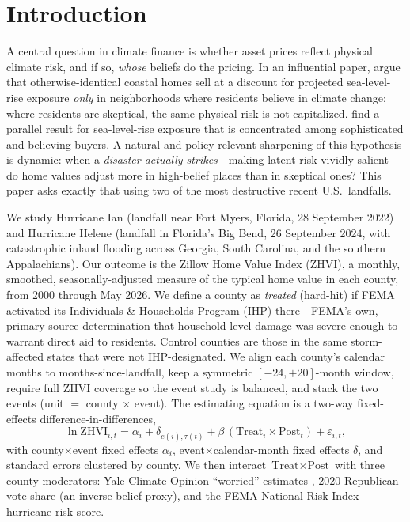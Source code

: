 \documentclass[12pt]{article}
\begin{document}
\newpage
\section{Introduction}\label{sec:intro}
A central question in climate finance is whether asset prices reflect physical climate risk,
and if so, \emph{whose} beliefs do the pricing. In an influential paper, \citet{baldauf2020}
argue that otherwise-identical coastal homes sell at a discount for projected sea-level-rise
exposure \emph{only} in neighborhoods where residents believe in climate change; where
residents are skeptical, the same physical risk is not capitalized. \citet{bernstein2019}
find a parallel result for sea-level-rise exposure that is concentrated among sophisticated
and believing buyers. A natural and policy-relevant sharpening of this hypothesis is dynamic:
when a \emph{disaster actually strikes}---making latent risk vividly salient---do home values
adjust more in high-belief places than in skeptical ones? This paper asks exactly that using
two of the most destructive recent U.S.\ landfalls.

We study Hurricane Ian (landfall near Fort Myers, Florida, 28 September 2022) and Hurricane
Helene (landfall in Florida's Big Bend, 26 September 2024, with catastrophic inland flooding
across Georgia, South Carolina, and the southern Appalachians). Our outcome is the Zillow
Home Value Index (ZHVI), a monthly, smoothed, seasonally-adjusted measure of the typical
home value in each county, from 2000 through May 2026. We define a county as \emph{treated}
(hard-hit) if FEMA activated its Individuals \& Households Program (IHP) there---FEMA's own,
primary-source determination that household-level damage was severe enough to warrant direct
aid to residents. Control counties are those in the same storm-affected states that were not
IHP-designated. We align each county's calendar months to months-since-landfall, keep a
symmetric $[-24,+20]$-month window, require full ZHVI coverage so the event study is
balanced, and stack the two events (unit $=$ county $\times$ event). The estimating equation
is a two-way fixed-effects difference-in-differences,
\begin{equation}
\ln \text{ZHVI}_{i,t} = \alpha_i + \delta_{e(i),\tau(t)} + \beta\,(\text{Treat}_i\times\text{Post}_t) + \varepsilon_{i,t},
\label{eq:did}
\end{equation}
with county$\times$event fixed effects $\alpha_i$, event$\times$calendar-month fixed effects
$\delta$, and standard errors clustered by county. We then interact $\text{Treat}\times\text{Post}$
with three county moderators: Yale Climate Opinion ``worried'' estimates \citep{howe2015},
2020 Republican vote share (an inverse-belief proxy), and the FEMA National Risk Index
hurricane-risk score.
\end{document}
